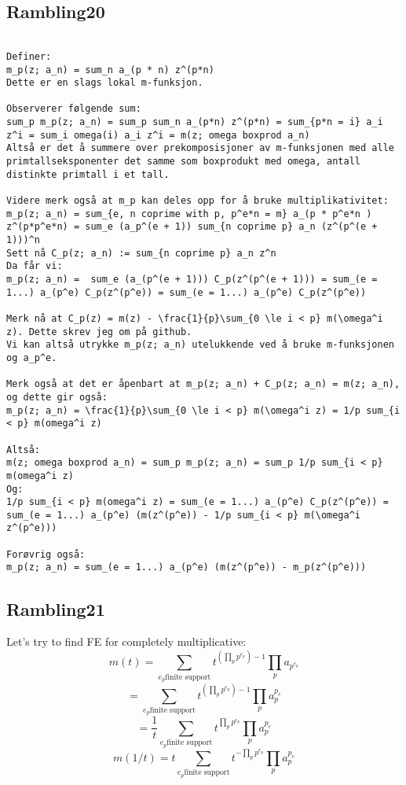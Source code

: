 \documentclass[a4paper]{amsart}
\begin{document}
\subsection{Rambling20}
\begin{verbatim}
  
Definer:
m_p(z; a_n) = sum_n a_(p * n) z^(p*n)
Dette er en slags lokal m-funksjon.

Observerer følgende sum:
sum_p m_p(z; a_n) = sum_p sum_n a_(p*n) z^(p*n) = sum_{p*n = i} a_i z^i = sum_i omega(i) a_i z^i = m(z; omega boxprod a_n)
Altså er det å summere over prekomposisjoner av m-funksjonen med alle primtallseksponenter det samme som boxprodukt med omega, antall distinkte primtall i et tall. 

Videre merk også at m_p kan deles opp for å bruke multiplikativitet:
m_p(z; a_n) = sum_{e, n coprime with p, p^e*n = m} a_(p * p^e*n ) z^(p*p^e*n) = sum_e (a_p^(e + 1)) sum_{n coprime p} a_n (z^(p^(e + 1)))^n
Sett nå C_p(z; a_n) := sum_{n coprime p} a_n z^n
Da får vi:
m_p(z; a_n) =  sum_e (a_(p^(e + 1))) C_p(z^(p^(e + 1))) = sum_(e = 1...) a_(p^e) C_p(z^(p^e)) = sum_(e = 1...) a_(p^e) C_p(z^(p^e))

Merk nå at C_p(z) = m(z) - \frac{1}{p}\sum_{0 \le i < p} m(\omega^i z). Dette skrev jeg om på github.
Vi kan altså utrykke m_p(z; a_n) utelukkende ved å bruke m-funksjonen og a_p^e. 

Merk også at det er åpenbart at m_p(z; a_n) + C_p(z; a_n) = m(z; a_n), og dette gir også:
m_p(z; a_n) = \frac{1}{p}\sum_{0 \le i < p} m(\omega^i z) = 1/p sum_{i < p} m(omega^i z)

Altså:
m(z; omega boxprod a_n) = sum_p m_p(z; a_n) = sum_p 1/p sum_{i < p} m(omega^i z) 
Og:
1/p sum_{i < p} m(omega^i z) = sum_(e = 1...) a_(p^e) C_p(z^(p^e)) = sum_(e = 1...) a_(p^e) (m(z^(p^e)) - 1/p sum_{i < p} m(\omega^i z^(p^e)))

Forøvrig også:
m_p(z; a_n) = sum_(e = 1...) a_(p^e) (m(z^(p^e)) - m_p(z^(p^e)))

\end{verbatim}


\subsection{Rambling21}
Let's try to find FE for completely multiplicative:
$$m(t) = \sum_{e_p \text{finite support}} t^{(\prod_p p^{e_p}) - 1} \prod_p a_{p^{e_p}}$$
$$ = \sum_{e_p \text{finite support}} t^{(\prod_p p^{e_p}) - 1} \prod_p a_p^{p_e}$$
$$ = \frac{1}{t} \sum_{e_p \text{finite support}} t^{\prod_p p^{e_p}} \prod_p a_p^{p_e}$$
$$m(1/t) = t \sum_{e_p \text{finite support}} t^{-\prod_p p^{e_p}} \prod_p a_p^{p_e}$$
\end{document}
